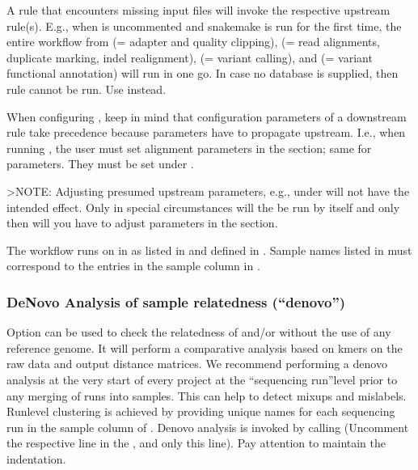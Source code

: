 \documentclass[letterpaper,10pt,english]{sphinxhowto}
\begin{document}
A rule that encounters missing input files will invoke the respective upstream rule(s). E.g., when  is uncommented and snakemake is run for the first time, the entire workflow from  (= adapter and quality clipping),  (= read alignments, duplicate marking, indel realignment),  (= variant calling), and  (= variant functional annotation) will run in one go.
In case no  database is supplied, then rule  cannot be run. Use  instead.

When configuring , keep in mind that configuration parameters of a downstream rule take precedence because parameters have to propagate upstream. I.e., when running , the user must set alignment parameters in the  section; same for  parameters. They must be set under .

\textgreater{}NOTE: Adjusting presumed upstream parameters, e.g., under  will not have the intended effect. Only in special circumstances will the  be run by itself and only then will you have to adjust parameters in the  section.

The workflow runs on  in  as listed in  and defined in . Sample names listed in  must correspond to the entries in the sample column in .


\subsubsection{De\sphinxhyphen{}Novo Analysis of sample relatedness (“denovo”)}
\label{\detokenize{index:id6}}
Option  can be used to check the relatedness of  and/or  without the use of any reference genome. It will perform a comparative analysis based on k\sphinxhyphen{}mers on the raw data and output distance matrices. We recommend performing a de\sphinxhyphen{}novo analysis at the very start of every project at the “sequencing run”\sphinxhyphen{}level prior to any merging of runs into samples. This can help to detect mix\sphinxhyphen{}ups and mislabels. Run\sphinxhyphen{}level clustering is achieved by providing unique names for each sequencing run in the sample column of . De\sphinxhyphen{}novo analysis is invoked by calling  (Uncomment the respective line in the , and only this line). Pay attention to maintain the indentation.
\end{document}
